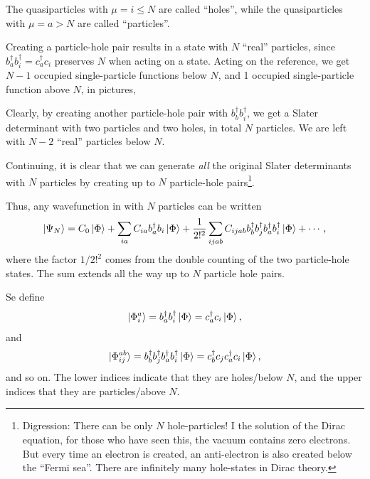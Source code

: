 \documentclass{report}
\theoremstyle{plain}
\theoremstyle{definition}
\begin{document}
The quasiparticles with $\mu = i\leq N$ are called ``holes'', while
the quasiparticles with $\mu = a>N$ are called ``particles''.

Creating a particle-hole pair results in a state with $N$ ``real''
particles, since $b^\dag_a b^\dag_i = c^\dag_a c_i$ preserves $N$ when
acting on a state. Acting on the reference, we get $N-1$ occupied
single-particle functions below $N$, and 1 occupied single-particle
function above $N$, in pictures,
\begin{center}
\end{center}

Clearly, by creating another particle-hole pair with $b^\dag_b
b^\dag_i$, we get a Slater determinant with two particles and two
holes, in total $N$ particles. We are left with $N-2$ ``real''
particles below $N$.

Continuing, it is clear that we can generate \emph{all} the original
Slater determinants with $N$ particles by creating up to $N$
particle-hole pairs\footnote{Digression: There can be only $N$ hole-particles! I
  the solution of the Dirac equation, for those who have seen this,
  the vacuum contains zero electrons. But every time an electron is
  created, an anti-electron is also created below the ``Fermi
  sea''. There are infinitely many hole-states in Dirac theory.}.

Thus, any wavefunction in with $N$ particles can be written
\begin{equation}
  \ket{\Psi_N} = C_0 \ket{\Phi} + \sum_{ia} C_{ia} b^\dag_a b_i
  \ket{\Phi} + \frac{1}{2!^2} \sum_{ijab} C_{ijab} b^\dag_b b^\dag_j b^\dag_a
  b^\dag_i\ket{\Phi} + \cdots ,
\end{equation}
where the factor $1/2!^2$ comes from the double counting of the two
particle-hole states. The sum extends all the way up to $N$ particle
hole pairs.

Se define
\begin{equation}
  \ket{\Phi_i^a} = b^\dag_a b^\dag_i \ket{\Phi} = c^\dag_a c_i
  \ket{\Phi},
\end{equation}
and
\begin{equation}
  \ket{\Phi_{ij}^{ab}} = b^\dag_b b^\dag_j b^\dag_a b^\dag_i
  \ket{\Phi} = c^\dag_b c_j c^\dag_a c_i
  \ket{\Phi},
\end{equation}
and so on. The lower indices indicate that they are holes/below $N$,
and the upper indices that they are particles/above $N$.
\end{document}
